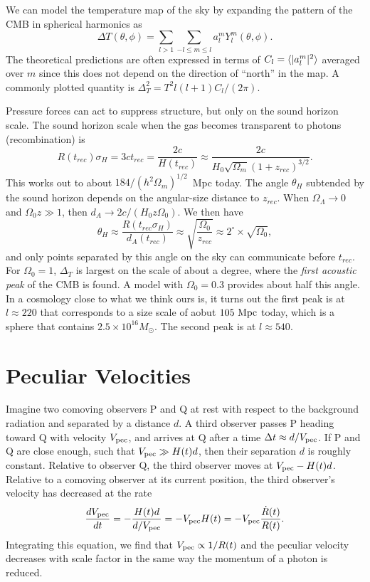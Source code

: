 \documentclass[]{article}
\begin{document}
We can model the temperature map of the sky by expanding
the pattern of the CMB in spherical harmonics as
\begin{equation}
\Delta T(\theta, \phi) = \sum_{l>1} \sum_{-l\le m \le l} a_l^m Y_l^m(\theta, \phi).
\end{equation}
\noindent
The theoretical predictions are often expressed in terms of $C_l = \langle|a_l^m|^2\rangle$ averaged over $m$ since this does not depend on the direction of ``north''
in the map.  A commonly plotted quantity is $\Delta_T^2 = T^2 l(l+1)C_l/(2\pi)$.


Pressure forces can act to suppress structure, but only on the
sound horizon scale.  The sound horizon scale when the
gas becomes transparent to photons (recombination) is
\begin{equation}
R(t_{rec}) \sigma_H = 3 c t_{rec} = \frac{2c}{H(t_{rec})} \approx \frac{2c}{H_0\sqrt{\Omega_m}(1+z_{rec})^{3/2}}.
\end{equation}
\noindent
This works out to about $184/(h^2 \Omega_m)^{1/2}$~Mpc today.  The
angle $\theta_H$ subtended by the sound horizon depends on
the angular-size distance to $z_{rec}$.  When $\Omega_\Lambda\to0$
and $\Omega_0 z\gg1$, then $d_A\to 2c/(H_0 z \Omega_0)$. We then
have
\begin{equation}
\theta_H \approx \frac{R(t_{rec}\sigma_H)}{d_A(t_{rec})} \approx \sqrt{\frac{\Omega_0}{z_{rec}}} \approx 2^\circ \times \sqrt{\Omega_0},
\end{equation}
\noindent
and only points separated by this angle on the sky can communicate before $t_{rec}$.  For $\Omega_0=1$, $\Delta_T$ is largest on the scale of about a degree,
where the {\it first acoustic peak} of the CMB is found. A model
with $\Omega_0=0.3$ provides about half this angle. In a cosmology
close to what we think ours is, it turns out the 
first peak is at $l\approx 220$ that corresponds to a size scale of 
aobut $105~\mathrm{Mpc}$ today, which is a sphere that contains $2.5\times10^{16}M_{\odot}$.  The second peak is at $l\approx540$.


\section{Peculiar Velocities}

Imagine two comoving observers P and Q at rest with
respect to the background radiation and separated by a distance
$d$.  A third
observer passes P heading toward Q with velocity $V_{\mathrm{pec}}$,
and arrives at Q after a time $\Delta t \approx d/V_{\mathrm{pec}}$.
If P and Q are close enough, such that $V_{\mathrm{pec}}\gg H(t)d$, then
their separation $d$ is roughly constant.  Relative to observer
Q, the third observer moves at $V_{\mathrm{pec}} - H(t)d$. Relative to
a comoving observer at its current position, the third observer's
velocity has decreased at the rate
\begin{equation}
\frac{dV_{\mathrm{pec}}}{dt} = - \frac{H(t)d}{d/V_{\mathrm{pec}}} = - V_{\mathrm{pec}} H(t) = - V_{\mathrm{pec}} \frac{\dot{R}(t)}{R(t)}.
\end{equation}
\noindent
Integrating this equation, we find that $V_{\mathrm{pec}} \propto 1/R(t)$ and
the peculiar velocity decreases with scale factor in the same way
the momentum of a photon is reduced.
\end{document}
